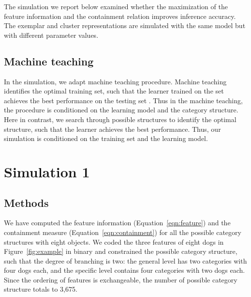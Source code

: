 \documentclass[doc]{apa6}
\begin{document}
The simulation we report below examined whether the maximization of the feature information and the
containment relation improves inference accuracy. The exemplar and cluster representations are
simulated with the same model but with different parameter values.


\subsection*{Machine teaching}

In the simulation, we adapt machine teaching procedure. Machine teaching identifies the optimal
training set, such that the learner trained on the set achieves the best performance on the testing
set \parencite{Zhu2013a, Patil2014a}.  Thus in the machine teaching, the procedure is conditioned on
the learning model and the category structure.  Here in contrast, we search through possible
structures to identify the optimal structure, such that the learner achieves the best performance.
Thus, our simulation is conditioned on the training set and the learning model.


\section*{Simulation 1}


\subsection*{Methods}

We have computed the feature information (Equation~\ref{eqn:feature}) and the containment measure
(Equation~\ref{eqn:containment}) for all the possible category structures with eight objects.  We
coded the three features of eight dogs in Figure~\ref{fig:example} in binary and constrained the
possible category structure, such that the degree of branching is two: the general level has two
categories with four dogs each, and the specific level contains four categories with two dogs each.
Since the ordering of features is exchangeable, the number of possible category structure totals to
3,675.
\end{document}
